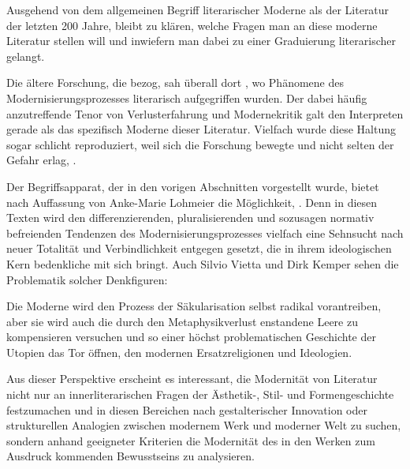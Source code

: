 
Ausgehend von dem allgemeinen Begriff literarischer Moderne als der Literatur
der letzten 200 Jahre, bleibt zu klären, welche Fragen man an diese moderne
Literatur stellen will und inwiefern man dabei zu einer Graduierung
literarischer \Cite{Modernität} gelangt.

Die ältere Forschung, die \Cite{ihren Modernebegriff mehr oder weniger aus den
  Texten selbst} bezog, sah überall dort \Cite{moderne Literatur}, wo Phänomene
des Modernisierungsprozesses literarisch aufgegriffen wurden. Der dabei
häufig anzutreffende Tenor von Verlusterfahrung und
Modernekritik galt den Interpreten gerade als das spezifisch Moderne
dieser Literatur. Vielfach wurde diese \Cite{antimoderne} Haltung sogar
schlicht reproduziert, weil sich die Forschung \Cite{im Wahrnehmungs- und
  Deutungssystem der Texte selbst} bewegte und nicht selten der Gefahr erlag,
\Cite{ihren Gegenstand lediglich zu verdoppeln}.

Der Begriffsapparat, der in den vorigen Abschnitten vorgestellt wurde,
bietet nach Auffassung von Anke-Marie Lohmeier die Möglichkeit, \Cite{die
  Position identifizierender Textverdopplung aufzugeben und auf analytische
  Distanz zu den Texten zu gehen}. Denn in diesen Texten wird den
differenzierenden, pluralisierenden und sozusagen normativ befreienden
Tendenzen des Modernisierungsprozesses vielfach eine Sehnsucht nach neuer
Totalität und Verbindlichkeit entgegen gesetzt, die in ihrem ideologischen
Kern bedenkliche \Cite{Einheit- und
  Ganzheitswünsche} mit sich bringt. Auch Silvio
Vietta und Dirk Kemper sehen die Problematik solcher Denkfiguren:  

\begin{BlockQuote}
  Die Moderne wird den Prozess der Säkularisation selbst radikal vorantreiben,
  aber sie wird auch die durch den Metaphysikverlust enstandene Leere zu
  kompensieren versuchen und so einer höchst problematischen Geschichte der
  Utopien das Tor öffnen, den modernen Ersatzreligionen und
  Ideologien.
\end{BlockQuote}
Aus dieser Perspektive erscheint es interessant, die Modernität von Literatur
nicht nur an innerliterarischen Fragen der Ästhetik-, Stil- und
Formengeschichte festzumachen und in diesen Bereichen nach gestalterischer
Innovation oder strukturellen Analogien zwischen modernem Werk und moderner
Welt zu suchen, sondern anhand geeigneter Kriterien die Modernität
des in den Werken zum Ausdruck kommenden Bewusstseins zu analysieren.

